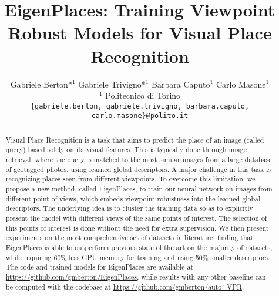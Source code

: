 \documentclass[10pt,twocolumn,letterpaper]{article}
\begin{document}
\title{EigenPlaces: Training Viewpoint Robust Models for Visual Place Recognition}


\author{Gabriele Berton*$^{1}$
\quad
Gabriele Trivigno*$^{1}$
\quad
Barbara Caputo$^{1}$
\quad
Carlo Masone$^{1}$\\
$^{1}$ Politecnico di Torino\\
{\tt\small \{gabriele.berton, gabriele.trivigno, barbara.caputo, carlo.masone\}@polito.it}\\
}


\maketitle
\ificcvfinal\thispagestyle{empty}\fi

\begin{abstract}
Visual Place Recognition is a task that aims to predict the place of an image (called query) based solely on its visual features.
This is typically done through image retrieval, where the query is matched to the most similar images from a large database of geotagged photos, using learned global descriptors.
A major challenge in this task is recognizing places seen from different viewpoints. To overcome this limitation, we propose a new method, called EigenPlaces, to train our neural network on images from different point of views, which embeds viewpoint robustness into the learned global descriptors. The underlying idea is to cluster the training data so as to explicitly present the model with different views of the same points of interest. The selection of this points of interest is done without the need for extra supervision.
We then present experiments on the most comprehensive set of datasets in literature, finding that EigenPlaces is able to outperform previous state of the art on the majority of datasets, while requiring 60\% less GPU memory for training and using 50\% smaller descriptors.
The code and trained models for EigenPlaces are available at {\small{\url{https://github.com/gmberton/EigenPlaces}}}, while results with any other baseline can be computed with the codebase at 
{\small{\url{https://github.com/gmberton/auto_VPR}}}.
\end{abstract}
\end{document}

